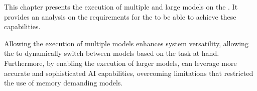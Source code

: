 This chapter presents the execution of multiple and large models on the \graicore{}.
It provides an analysis on the requirements for the \confignoc{} to be able to achieve these capabilities.

Allowing the execution of multiple models enhances system versatility, allowing the \graicore{} to dynamically switch between models based on the task at hand.
Furthermore, by enabling the execution of larger models, \graicore{} can leverage more accurate and sophisticated AI capabilities, overcoming limitations that restricted the use of memory demanding models.
